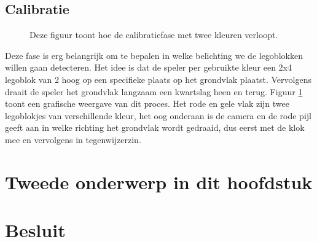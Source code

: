 \subsection{Calibratie}
\begin{figure}
  \centering
	\caption{Deze figuur toont hoe de calibratiefase met twee kleuren verloopt.}
	\label{fig:calib}
\end{figure}

Deze fase is erg belangrijk om te bepalen in welke belichting we de legoblokken willen gaan detecteren. Het idee is dat de speler per gebruikte kleur een 2x4 legoblok van 2 hoog op een specifieke plaats op het grondvlak plaatst. Vervolgens draait de speler het grondvlak langzaam een kwartslag heen en terug. Figuur \ref{fig:calib} toont een grafische weergave van dit proces. Het rode en gele vlak zijn twee legoblokjes van verschillende kleur, het oog onderaan is de camera en de rode pijl geeft aan in welke richting het grondvlak wordt gedraaid, dus eerst met de klok mee en vervolgens in tegenwijzerzin. 

\section{Tweede onderwerp in dit hoofdstuk}

\section{Besluit}

